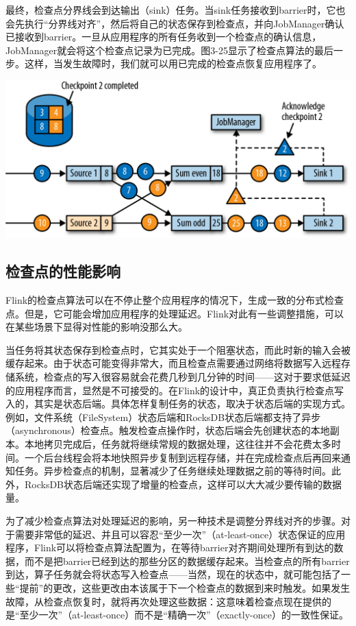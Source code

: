 \documentclass[oneside]{ctexbook}
\begin{document}
最终，检查点分界线会到达输出（sink）任务。当sink任务接收到barrier时，它也会先执行“分界线对齐”，然后将自己的状态保存到检查点，并向JobManager确认已接收到barrier。一旦从应用程序的所有任务收到一个检查点的确认信息，JobManager就会将这个检查点记录为已完成。图3-25显示了检查点算法的最后一步。这样，当发生故障时，我们就可以用已完成的检查点恢复应用程序了。

\noindent \includegraphics[width=\textwidth]{spaf_0325.png}

\subsection{检查点的性能影响}

Flink的检查点算法可以在不停止整个应用程序的情况下，生成一致的分布式检查点。但是，它可能会增加应用程序的处理延迟。Flink对此有一些调整措施，可以在某些场景下显得对性能的影响没那么大。

当任务将其状态保存到检查点时，它其实处于一个阻塞状态，而此时新的输入会被缓存起来。由于状态可能变得非常大，而且检查点需要通过网络将数据写入远程存储系统，检查点的写入很容易就会花费几秒到几分钟的时间——这对于要求低延迟的应用程序而言，显然是不可接受的。在Flink的设计中，真正负责执行检查点写入的，其实是状态后端。具体怎样复制任务的状态，取决于状态后端的实现方式。例如，文件系统（FileSystem）状态后端和RocksDB状态后端都支持了异步（asynchronous）检查点。触发检查点操作时，状态后端会先创建状态的本地副本。本地拷贝完成后，任务就将继续常规的数据处理，这往往并不会花费太多时间。一个后台线程会将本地快照异步复制到远程存储，并在完成检查点后再回来通知任务。异步检查点的机制，显著减少了任务继续处理数据之前的等待时间。此外，RocksDB状态后端还实现了增量的检查点，这样可以大大减少要传输的数据量。

为了减少检查点算法对处理延迟的影响，另一种技术是调整分界线对齐的步骤。对于需要非常低的延迟、并且可以容忍“至少一次”（at-least-once）状态保证的应用程序，Flink可以将检查点算法配置为，在等待barrier对齐期间处理所有到达的数据，而不是把barrier已经到达的那些分区的数据缓存起来。当检查点的所有barrier到达，算子任务就会将状态写入检查点——当然，现在的状态中，就可能包括了一些“提前”的更改，这些更改由本该属于下一个检查点的数据到来时触发。如果发生故障，从检查点恢复时，就将再次处理这些数据：这意味着检查点现在提供的是“至少一次”（at-least-once）而不是“精确一次”（exactly-once）的一致性保证。
\end{document}
